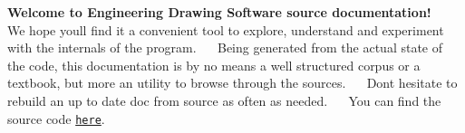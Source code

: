 {\bfseries Welcome to Engineering Drawing Software source documentation!}~\newline
~\newline
We hope you\textquotesingle{}ll find it a convenient tool to explore, understand and experiment with the internals of the program.~\newline
~\newline
Being generated from the actual state of the code, this documentation is by no means a well structured corpus or a textbook, but more an utility to browse through the sources.~\newline
~\newline
Don\textquotesingle{}t hesitate to rebuild an up to date doc from source as often as needed.~\newline
~\newline
You can find the source code \href{https://github.com/sunil-sopho/Cop290}{\tt here}. 